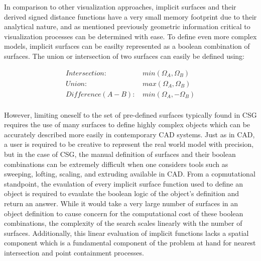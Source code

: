 \documentclass[12pt, a4paper]{article}
\begin{document}
In comparison to other visualization approaches, implicit surfaces and their derived signed distance functions have a very small memory footprint due to their analytical nature, and as mentioned previously geometric information critical to visualization processes can be determined with ease. To define even more complex models, implicit surfaces can be easilty represented as a boolean combination of surfaces. The union or intersection of two surfaces can easily be defined using:

\begin{align*}
  Intersection: & \, min(\Omega_{A}, \Omega_{B}) \\
  Union: & \, max(\Omega_{A}, \Omega_{B}) \\
  Difference (A-B): & \, min(\Omega_{A}, -\Omega_{B}) \\
\end{align*}


However, limiting oneself to the set of pre-defined surfaces typically found in CSG requires the use of many surfaces to define highly complex objects which can be accurately described more easily in contemporary CAD systems. Just as in CAD, a user is required to be creative to represent the real world model with precision, but in the case of CSG, the manual definition of surfaces and their boolean combinations can be extremely difficult when one considers tools such as sweeping, lofting, scaling, and extruding available in CAD. From a copmutational standpoint, the evaulation of every implicit surface function used to define an object is required to evaulate the boolean logic of the object's definition and return an answer. While it would take a very large number of surfaces in an object definition to cause concern for the computational cost of these boolean combinations, the complexity of the search scales linearly with the number of surfaces. Additionally, this linear evaluation of implicit functions lacks a spatial component which is a fundamental component of the problem at hand for nearest intersection and point containment processes.
\end{document}
